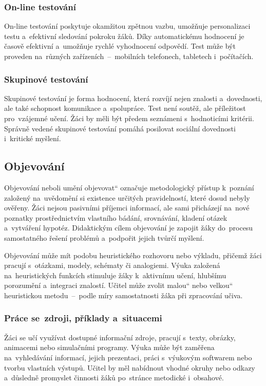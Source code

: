\documentclass[male,czech,api_bc]{kitheses}
\begin{document}
\subsubsection{On-line testování}
On-line testování poskytuje okamžitou zpětnou vazbu, umožňuje personalizaci testu a~efektivní sledování pokroku žáků. Díky automatickému hodnocení je časově efektivní a~umožňuje rychlé vyhodnocení odpovědí. Test může být proveden na~různých zařízeních~--~mobilních telefonech, tabletech i~počítačích.\cite{eduOnlineTestovani}

\subsubsection{Skupinové testování}
Skupinové testování je forma hodnocení, která rozvíjí nejen znalosti a~dovednosti, ale také schopnost komunikace a~spolupráce. Test není soutěž, ale příležitost pro~vzájemné učení. Žáci by měli být předem seznámeni s~hodnoticími kritérii. Správně vedené skupinové testování pomáhá posilovat sociální dovednosti i~kritické myšlení.\cite{eduSkupinoveTestovani}

\subsection{Objevování}

Objevování neboli \quotedblbase umění objevovat`` označuje metodologický přístup k~poznání založený na~uvědomění si existence určitých pravidelností, které dosud nebyly ověřeny. Žáci nejsou pasivními příjemci informací, ale sami přicházejí na~nové poznatky prostřednictvím vlastního bádání, srovnávání, kladení otázek a~vytváření hypotéz. Didaktickým cílem objevování je zapojit žáky do~procesu samostatného řešení problémů a~podpořit jejich tvůrčí myšlení.

Objevování může mít podobu heuristického rozhovoru nebo výkladu, přičemž žáci pracují s~otázkami, modely, schématy či analogiemi. Výuka založená na~heuristických funkcích stimuluje žáky k~aktivnímu učení, hlubšímu porozumění a~integraci znalostí. Učitel může zvolit \quotedblbase malou`` nebo \quotedblbase velkou`` heuristickou metodu~--~podle míry samostatnosti žáka při zpracování učiva.\cite{eduObjevovani}

\subsubsection{Práce se~zdroji, příklady a~situacemi}

Žáci se učí využívat dostupné informační zdroje, pracují s~texty, obrázky, animacemi nebo simulačními programy. Výuka může být zaměřena na~vyhledávání informací, jejich prezentaci, práci s~výukovým softwarem nebo tvorbu vlastních výstupů. Učitel by měl nabídnout vhodné okruhy nebo odkazy a~důsledně promyslet činnosti žáků po~stránce metodické i~obsahové.\cite{eduPraceSeZdrojiPrikladySituacemi}
\end{document}
